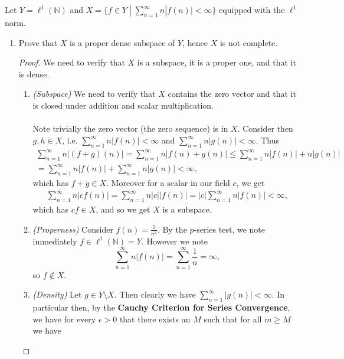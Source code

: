 \documentclass[12pt]{article}
\newenvironment{ex}[2][Exercise]{\begin{trivlist}
\item[\hskip \labelsep {\bfseries #1}\hskip \labelsep {\bfseries #2.}]}{\end{trivlist}}
\begin{document}
\begin{ex}{6}
    Let $Y = \ell^1(\mathbb{N})$ and $X = \{f \in Y \; | \; \sum_{n = 1}^\infty n|f(n)| < \infty\}$ equipped with the $\ell^1$ norm. 
    \begin{enumerate}[label=(\alph*)]
        \item Prove that $X$ is a proper dense subspace of $Y$, hence $X$ is not complete.
        \begin{proof}
            We need to verify that $X$ is a subspace, it is a proper one, and that it is dense.
            \begin{enumerate}[label=(\roman*)]
                \item \textit{(Subspace)} We need to verify that $X$ contains the zero vector and that it is closed under addition and scalar multiplication.
                    \\ \\ Note trivially the zero vector (the zero sequence) is in $X$. Consider then $g, h \in X$, i.e. $\sum_{n = 1}^\infty n|f(n)| < \infty$ and $\sum_{n = 1}^\infty n|g(n)| < \infty$. Thus
                    \begin{align*}
                        \sum_{n = 1}^\infty n|(f + g)(n)| = \sum_{n = 1}^\infty n|f(n) + g(n)| \leq \sum_{n = 1}^\infty n|f(n)| + n|g(n)|  \\ = \sum_{n = 1}^\infty n|f(n)| + \sum_{n = 1}^\infty n|g(n)| < \infty,
                    \end{align*}
                    which has $f + g \in X$. Moreover for a scalar in our field $c$, we get
                    \begin{align*}
                        \sum_{n = 1}^\infty n|cf(n)| = \sum_{n = 1}^\infty n|c||f(n)| = |c|\sum_{n = 1}^\infty n|f(n)| < \infty,
                    \end{align*}
                    which has $cf \in X$, and so we get $X$ is a subspace.
                \item \textit{(Properness)}
                    Consider $f(n) = \frac{1}{n^2}$. By the $p$-series test, we note immediately $f \in \ell^1({\mathbb{N}}) = Y$. However we note
                    $$\sum_{n = 1}^\infty n|f(n)| = \sum_{n = 1}^\infty \frac{1}{n} = \infty,$$
                    so $f \notin X$. 
                \item \textit{(Density)}
                    Let $g \in Y \setminus X$. Then clearly we have $\sum_{n = 1}^\infty |g(n)| < \infty$. In particular then, by the \textbf{Cauchy Criterion for Series Convergence}, we have for every $\epsilon > 0$ that there exists an $M$ such that for all $m \geq M$ we have 

\end{enumerate}
\end{proof}
\end{enumerate}
\end{ex}
\end{document}
